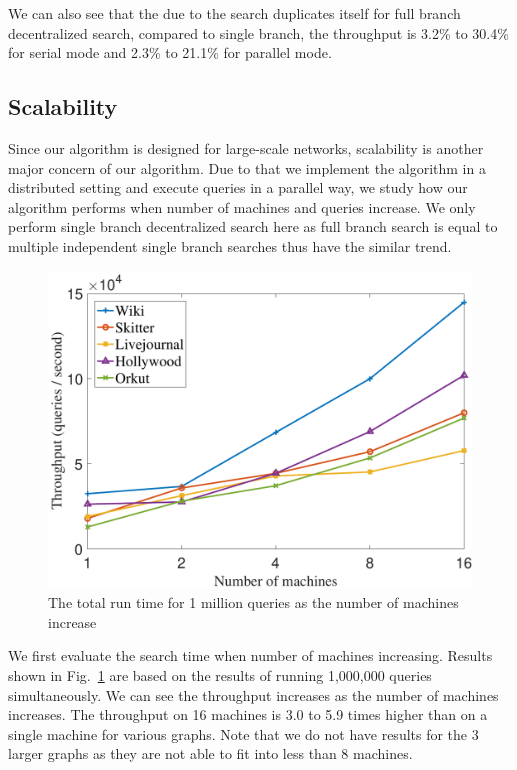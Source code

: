 We can also see that the due to the search duplicates itself for full branch decentralized search, compared to single branch, the throughput is 3.2\% to 30.4\% for serial mode and 2.3\% to 21.1\% for parallel mode. 

\subsection{Scalability}
\label{eval_scalability}

Since our algorithm is designed for large-scale networks, scalability is another major concern of our algorithm. Due to that we implement the algorithm in a distributed setting and execute queries in a parallel way, we study how our algorithm performs when number of machines and queries increase. We only perform single branch decentralized search here as full branch search is equal to multiple independent single branch searches thus have the similar trend.

\begin{figure}[t]
    \centering
    \includegraphics[width=\linewidth]{./figures/scale_machine_throughput.pdf}
    \caption{The total run time for 1 million queries as the number of machines increase}
    \label{fig:scale_machine}
\end{figure}

We first evaluate the search time when number of machines increasing. Results shown in Fig.~\ref{fig:scale_machine} are based on the results of running 1,000,000 queries simultaneously. We can see the throughput increases as the number of machines increases. The throughput on 16 machines is 3.0 to 5.9 times higher than on a single machine for various graphs. Note that we do not have results for the 3 larger graphs as they are not able to fit into less than 8 machines.

